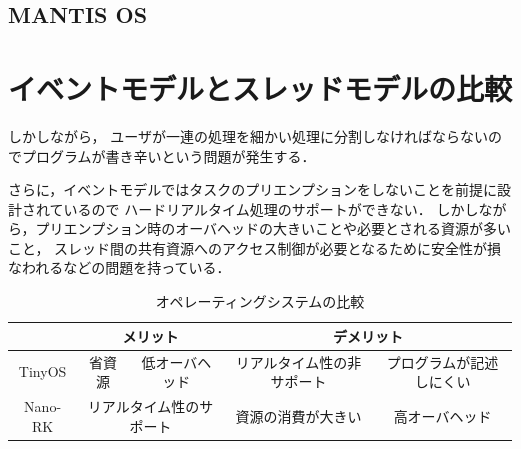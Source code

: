 \subsection{MANTIS OS}


%
%
%


\section{イベントモデルとスレッドモデルの比較}
しかしながら，
ユーザが一連の処理を細かい処理に分割しなければならないのでプログラムが書き辛いという問題が発生する．

さらに，イベントモデルではタスクのプリエンプションをしないことを前提に設計されているので
ハードリアルタイム処理のサポートができない．
しかしながら，プリエンプション時のオーバヘッドの大きいことや必要とされる資源が多いこと，
スレッド間の共有資源へのアクセス制御が必要となるために安全性が損なわれるなどの問題を持っている．

\begin{table}[htb]
  \centering
  \caption{オペレーティングシステムの比較}
  \begin{tabular}{|c||c|c|c|c|} \hline
    \backslashbox{}{} & \multicolumn{2}{|c|}{メリット} & \multicolumn{2}{|c|}{デメリット} \\ \hline \hline
    TinyOS & 省資源 & 低オーバヘッド & リアルタイム性の非サポート & プログラムが記述しにくい \\ \hline
    Nano-RK & \multicolumn{2}{|c|}{リアルタイム性のサポート} & 資源の消費が大きい & 高オーバヘッド \\ \hline
  \end{tabular}
  \label{tab:merit_and_demerit}
\end{table}

